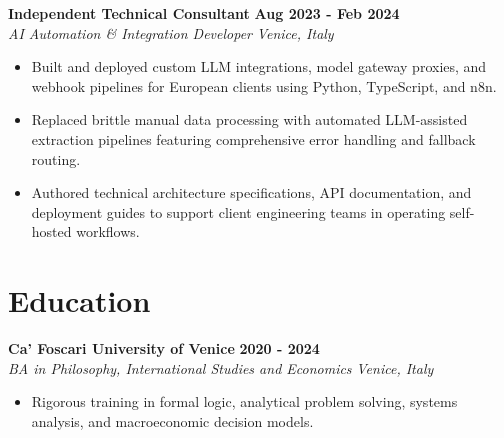 \documentclass[10pt,a4paper]{article}
\newcommand{\role}[4]{%
  \textbf{#1} \hfill \textbf{#2}\\[1pt]%
  \textit{#3} \hfill \textit{#4}\\[2pt]%
}
\begin{document}
\role{Independent Technical Consultant}{Aug 2023 - Feb 2024}{AI Automation \& Integration Developer}{Venice, Italy}
\begin{itemize}
  \item Built and deployed custom LLM integrations, model gateway proxies, and webhook pipelines for European clients using Python, TypeScript, and n8n.
  \item Replaced brittle manual data processing with automated LLM-assisted extraction pipelines featuring comprehensive error handling and fallback routing.
  \item Authored technical architecture specifications, API documentation, and deployment guides to support client engineering teams in operating self-hosted workflows.
\end{itemize}

\section{Education}
\role{Ca' Foscari University of Venice}{2020 - 2024}{BA in Philosophy, International Studies and Economics}{Venice, Italy}
\begin{itemize}
  \item Rigorous training in formal logic, analytical problem solving, systems analysis, and macroeconomic decision models.
\end{itemize}
\end{document}
